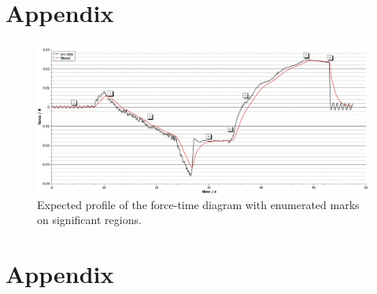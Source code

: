 \chapter{Appendix}
    \begin{figure}[h]
        \centering
        \includegraphics[width=.9\textwidth]{referenzen/instructions_fig14.jpg}
        \caption[Expected profile of the force-time diagram]{Expected profile of the force-time diagram with enumerated marks on significant regions.}
        \label{fig:instructions_fig14}
    \end{figure}
\newpage
\chapter{Appendix}
%

\newpage

\newpage

